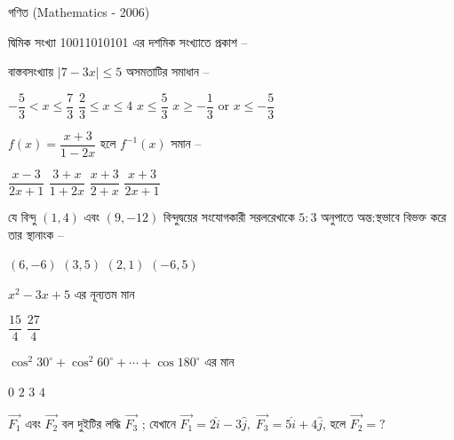 \documentclass[addpoints]{exam}
\begin{document}
\begin{LARGE}
\begin{center}
গণিত (Mathematics - 2006)
\end{center}
\end{LARGE}
\begin{questions}

\question দ্বিমিক সংখ্যা 10011010101 এর দশমিক সংখ্যাতে  প্রকাশ  –

\begin{oneparchoices}
\end{oneparchoices}

\question বাস্তবসংখ্যায় $ |7-3x|\le 5 $ অসমতাটির সমাধান – 

\begin{oneparchoices}
\choice $ -\dfrac{5}{3}<x\le \dfrac{7}{3} $
\choice $ \dfrac{2}{3}\le x \le 4 $
\choice $ x\le \dfrac{5}{3}$
\choice $x\ge -\dfrac{1}{3}$ or $x\le  -\dfrac{5}{3} $
\end{oneparchoices}

\question  $ f(x) = \dfrac{x+3}{1-2x} $ হলে $  f^{-1}(x) $ সমান –

\begin{oneparchoices}
\choice $ \dfrac{x-3}{2x+1}$
\choice $ \dfrac{3+x}{1+2x}$
\choice $ \dfrac{x+3}{2+x}$
\choice  $ \dfrac{x+3}{2x+1}$
\end{oneparchoices}

\question যে বিন্দু $ (1,4) $ এবং $ (9,-12) $ বিন্দুদ্বয়ের সংযোগকারী সরলরেখাকে $ 5:3 $ অনুপাতে অন্ত:স্থভাবে বিভক্ত করে তার স্থানাংক –

\begin{oneparchoices}
\choice $ (6,-6) $
\choice $ (3,5) $
\choice $ (2, 1) $
\choice $ (-6,5) $
\end{oneparchoices}

\question $ x^{2}-3x+5 $  এর নূন্যতম মান

\begin{oneparchoices}
\choice $ \dfrac{15}{4} $
\choice $ \dfrac{27}{4} $
\end{oneparchoices}

\question $ \cos^{2} 30^{\circ} +\cos^{2} 60^{\circ} + \cdots + \cos 180^{\circ}$ এর মান

\begin{oneparchoices}
\choice $ 0 $
\choice $ 2 $
\choice $ 3 $
\choice $ 4 $
\end{oneparchoices}

 \question $ \vec{F_{1}}  $ এবং $ \vec{F_{2}}  $  বল দুইটির লদ্ধি $ \vec{F_{3}}  $ ; যেখানে $ \vec{F_{1}} = 2\hat{i}-3\hat{j},\;  \vec{F_{3}}= 5\hat{i}+4\hat{j}  $,  হলে $ \vec{F_{2}} =? $


\end{questions}
\end{document}
